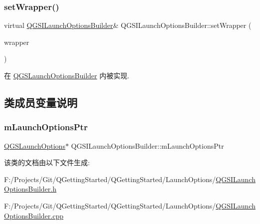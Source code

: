\subsubsection{\texorpdfstring{set\+Wrapper()}{setWrapper()}}
{\footnotesize\ttfamily virtual \mbox{\hyperlink{class_q_g_s_i_launch_options_builder}{Q\+G\+S\+I\+Launch\+Options\+Builder}}\& Q\+G\+S\+I\+Launch\+Options\+Builder\+::set\+Wrapper (\begin{DoxyParamCaption}\item[{const Q\+String \&}]{wrapper }\end{DoxyParamCaption})\hspace{0.3cm}{\ttfamily [pure virtual]}}



在 \mbox{\hyperlink{class_q_g_s_launch_options_builder_a0f273717f178f93bb964d34e333110e9}{Q\+G\+S\+Launch\+Options\+Builder}} 内被实现.



\subsection{类成员变量说明}
\mbox{\label{class_q_g_s_i_launch_options_builder_abbbc14faf6a9c441b5611b2d5e1f4835}} 
\subsubsection{\texorpdfstring{m\+Launch\+Options\+Ptr}{mLaunchOptionsPtr}}
{\footnotesize\ttfamily \mbox{\hyperlink{class_q_g_s_launch_options}{Q\+G\+S\+Launch\+Options}}$\ast$ Q\+G\+S\+I\+Launch\+Options\+Builder\+::m\+Launch\+Options\+Ptr\hspace{0.3cm}{\ttfamily [protected]}}



该类的文档由以下文件生成\+:\begin{DoxyCompactItemize}
\item 
F\+:/\+Projects/\+Git/\+Q\+Getting\+Started/\+Q\+Getting\+Started/\+Launch\+Options/\mbox{\hyperlink{_q_g_s_i_launch_options_builder_8h}{Q\+G\+S\+I\+Launch\+Options\+Builder.\+h}}\item 
F\+:/\+Projects/\+Git/\+Q\+Getting\+Started/\+Q\+Getting\+Started/\+Launch\+Options/\mbox{\hyperlink{_q_g_s_i_launch_options_builder_8cpp}{Q\+G\+S\+I\+Launch\+Options\+Builder.\+cpp}}\end{DoxyCompactItemize}
